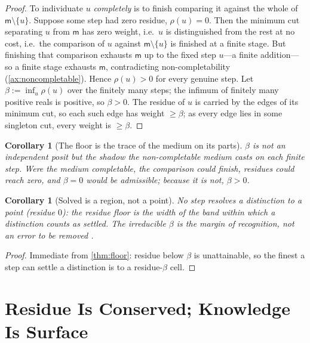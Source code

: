 \documentclass[11pt,a4paper]{article}
\theoremstyle{thmstyle}
\newtheorem{corollary}[theorem]{Corollary}
\theoremstyle{definition}
\theoremstyle{remark}
\newcommand{\med}{\mathsf{m}}           %
\newcommand{\flo}{\beta}                %
\newcommand{\res}{\rho}                 %
\newcommand{\set}[1]{\{#1\}}
\begin{document}
\begin{proof}
To individuate $u$ \emph{completely} is to finish comparing it against the whole
of $\med\setminus\set u$. Suppose some step had zero residue, $\res(u)=0$. Then
the minimum cut separating $u$ from $\med$ has zero weight, i.e.\ $u$ is
distinguished from the rest at no cost, i.e.\ the comparison of $u$ against
$\med\setminus\set u$ is finished at a finite stage. But finishing that
comparison exhausts $\med$ up to the fixed step $u$---a finite addition---so a
finite stage exhausts $\med$, contradicting non-completability
(\cref{ax:noncompletable}). Hence $\res(u)>0$ for every genuine step. Let
$\flo:=\inf_u\res(u)$ over the finitely many steps; the infimum of finitely many
positive reals is positive, so $\flo>0$. The residue of $u$ is carried by the
edges of its minimum cut, so each such edge has weight $\ge\flo$; as every edge
lies in some singleton cut, every weight is $\ge\flo$.
\end{proof}

\begin{corollary}[The floor is the trace of the medium on its parts]
\label{cor:trace}
$\flo$ is not an independent posit but the shadow the non-completable medium
casts on each finite step. Were the medium completable, the comparison could
finish, residues could reach zero, and $\flo=0$ would be admissible; because it
is not, $\flo>0$.
\end{corollary}

\begin{corollary}[Solved is a region, not a point]
\label{cor:region}
No step resolves a distinction to a point (residue $0$): the residue floor is
the width of the band within which a distinction counts as settled. The
irreducible $\flo$ is the margin of recognition, not an error to be removed
\citep{black1937}.
\end{corollary}

\begin{proof}
Immediate from \cref{thm:floor}: residue below $\flo$ is unattainable, so the
finest a step can settle a distinction is to a residue-$\flo$ cell.
\end{proof}

\section{Residue Is Conserved; Knowledge Is Surface}
\label{sec:residue}
\end{document}
